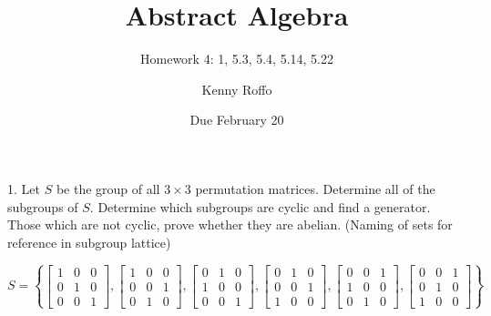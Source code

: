 \documentclass{scrartcl}
\title{Abstract Algebra}
\subtitle{Homework 4: 1, 5.3, 5.4, 5.14, 5.22}
\author{Kenny Roffo}
\date{Due February 20}
\begin{document}
\maketitle

1. Let $S$ be the group of all $3\times 3$ permutation matrices. Determine all of the subgroups of $S$. Determine which subgroups are cyclic and find a generator. Those which are not cyclic, prove whether they are abelian. (Naming of sets for reference in subgroup lattice)

\begin{displaymath}
S=\left \{
\begin{bmatrix}
1 & 0 & 0 \\
0 & 1 & 0 \\
0 & 0 & 1 
\end{bmatrix},
\begin{bmatrix}
1 & 0 & 0 \\
0 & 0 & 1 \\
0 & 1 & 0 
\end{bmatrix},
\begin{bmatrix}
0 & 1 & 0 \\
1 & 0 & 0 \\
0 & 0 & 1 
\end{bmatrix},
\begin{bmatrix}
0 & 1 & 0 \\
0 & 0 & 1 \\
1 & 0 & 0 
\end{bmatrix},
\begin{bmatrix}
0 & 0 & 1 \\
1 & 0 & 0 \\
0 & 1 & 0 
\end{bmatrix},
\begin{bmatrix}
0 & 0 & 1 \\
0 & 1 & 0 \\
1 & 0 & 0 
\end{bmatrix}
\right \}
\end{displaymath}
\end{document}
